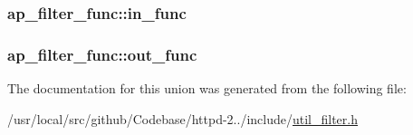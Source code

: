 \subsubsection[{\texorpdfstring{in\+\_\+func}{in_func}}]{ ap\+\_\+filter\+\_\+func\+::in\+\_\+func}\hypertarget{unionap__filter__func_a83be4d45d8c5dc85ad72ef578877a01f}{}\label{unionap__filter__func_a83be4d45d8c5dc85ad72ef578877a01f}
\subsubsection[{\texorpdfstring{out\+\_\+func}{out_func}}]{ ap\+\_\+filter\+\_\+func\+::out\+\_\+func}\hypertarget{unionap__filter__func_a225026b71249db645ec7e7d06d7240d9}{}\label{unionap__filter__func_a225026b71249db645ec7e7d06d7240d9}


The documentation for this union was generated from the following file\+:\begin{DoxyCompactItemize}
\item 
/usr/local/src/github/\+Codebase/httpd-\/2../include/\hyperlink{util__filter_8h}{util\+\_\+filter.\+h}\end{DoxyCompactItemize}
